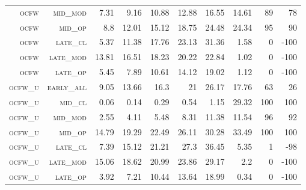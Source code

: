 \begin{landscape}
\begin{table}[!htbp]
\begin{tabular}{@{}rrrrrrr|rrr@{}}
 \textsc{ocfw}        &  \textsc{mid\_mod  }      &  7.31           &  9.16             &  10.88     &  12.88           &  16.55      &  14.61    &  89    &  78      \\
 \textsc{ocfw}        &  \textsc{mid\_op   }      &  8.8            &  12.01            &  15.12     &  18.75           &  24.48      &  24.34    &  95    &  90       \\
 \textsc{ocfw}        &  \textsc{late\_cl  }      &  5.37           &  11.38            &  17.76     &  23.13           &  31.36      &  1.58     &  0     &  -100      \\
 \textsc{ocfw}        &  \textsc{late\_mod }      &  13.81          &  16.51            &  18.23     &  20.22           &  22.84      &  1.02     &  0     &  -100      \\
 \textsc{ocfw}        &  \textsc{late\_op  }      &  5.45           &  7.89             &  10.61     &  14.12           &  19.02      &  1.12     &  0     &  -100      \\
 \textsc{ocfw\_u}     &  \textsc{early\_all}      &  9.05           &  13.66            &  16.3      &  21              &  26.17      &  17.76    &  63    &  26       \\
 \textsc{ocfw\_u}     &  \textsc{mid\_cl   }      &  0.06           &  0.14             &  0.29      &  0.54            &  1.15       &  29.32    &  100   &  100      \\
 \textsc{ocfw\_u}     &  \textsc{mid\_mod  }      &  2.55           &  4.11             &  5.48      &  8.31            &  11.38      &  11.54    &  96    &  92       \\
 \textsc{ocfw\_u}     &  \textsc{mid\_op   }      &  14.79          &  19.29            &  22.49     &  26.11           &  30.28      &  33.49    &  100   &  100      \\
 \textsc{ocfw\_u}     &  \textsc{late\_cl  }      &  7.39           &  15.12            &  21.21     &  27.3            &  36.45      &  5.35     &  1     &  -98      \\
 \textsc{ocfw\_u}     &  \textsc{late\_mod }      &  15.06          &  18.62            &  20.99     &  23.86           &  29.17      &  2.2      &  0     &  -100    \\
 \textsc{ocfw\_u}     &  \textsc{late\_op  }      &  3.92           &  7.21             &  10.44     &  13.64           &  18.99      &  0.34     &  0     &  -100      \\
\end{tabular}
\end{table}
\end{landscape}

